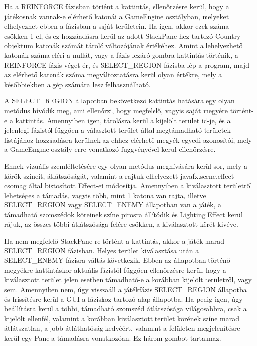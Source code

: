 Ha a REINFORCE fázisban történt a kattintás, ellenőrzésre kerül, hogy a játékosnak vannak-e elérhető katonái a GameEngine osztályban, melyeket elhelyezhet ebben a fázisban a saját területein. Ha igen, akkor ezek száma csökken 1-el, és ez hozzáadásra kerül az adott StackPane-hez tartozó Country objektum katonák számát tároló változójának értékéhez. Amint a lehelyezhető katonák száma eléri a nullát, vagy a fázis lezáró gombra kattintás történik, a REINFORCE fázis véget ér, és SELECT\_REGION fázisba lép a program, majd az elérhető katonák száma megváltoztatásra kerül olyan értékre, mely a későbbiekben a gép számára lesz felhasználható. 

A SELECT\_REGION állapotban bekövetkező kattintás hatására egy olyan metódus hívódik meg, ami ellenőrzi, hogy megfelelő, vagyis saját megyére történt-e a kattintás. Amennyiben igen, tárolásra kerül a kijelölt terület id-je, és a jelenlegi fázistól függően a választott terület által megtámadható területek listájához hozzáadásra kerülnek az ehhez elérhető megyék egyedi azonosítói, mely a GameEngine osztály erre vonatkozó függvényével kerül ellenőrzésre. 

Ennek vizuális szemléltetésére egy olyan metódus meghívására kerül sor, mely a körök színeit, átlátszóságát, valamint a rajtuk elhelyezett javafx.scene.effect csomag által biztosított Effect-et módosítja. Amennyiben a kiválasztott területről lehetséges a támadás, vagyis több, mint 1 katona van rajta, illetve SELECT\_REGION vagy SELECT\_ENEMY állapotban van a játék, a támadható szomszédok köreinek színe pirosra állítódik és Lighting Effect kerül rájuk, az összes többi átlátszósága felére csökken, a kiválasztott körét kivéve. 

Ha nem megfelelő StackPane-re történt a kattintás, akkor a játék marad SELECT\_REGION fázisban. Helyes terület kiválasztása után a SELECT\_ENEMY fázisra váltás következik. Ebben az állapotban történő megyékre kattintáskor aktuális fázistól függően ellenőrzésre kerül, hogy a kiválasztott terület jelen esetben támadható-e a korábban kijelölt területről, vagy sem. Amennyiben nem, úgy visszaáll a játékfázis SELECT\_REGION állapotba és frissítésre kerül a GUI a fázishoz tartozó alap állapotba. Ha pedig igen, úgy beállításra kerül a többi, támadható szomszéd átlátszósága világosabbra, csak a kijelölt ellenfél, valamint a korábban kiválasztott terület körének színe marad átlátszatlan, a jobb átláthatóság kedvéért, valamint a felületen megjelenítésre kerül egy Pane a támadásra vonatkozóan. Ez három gombot tartalmaz. 

